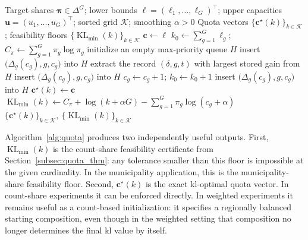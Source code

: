 \documentclass[10pt,journal]{IEEEtran}
\newcommand{\kGrid}{\mathcal{K}}
\newcommand{\1}{\mathbf{1}}
\newcommand{\bc}{\mathbf{c}}
\newcommand{\bpi}{\boldsymbol{\pi}}
\DeclareMathOperator{\KL}{KL}
\theoremstyle{ieeethm}
\begin{document}
\begingroup
\algrenewcommand{}
\algrenewcommand{}
\algnewcommand{}
\algnewcommand{}
\algnewcommand\Break{\State \algorithmicbreak}
\algnewcommand\Continue{\State \algorithmiccontinue}

\begin{algorithm}[t]
\caption{Greedy Computation of -Optimal Count Quotas Using a Priority Queue with Lazy Updates}
\label{alg:quota}
\begin{algorithmic}[1]
\Require
Target shares $\bpi\in\Delta^G$; lower bounds $\boldsymbol{\ell}=(\ell_1,\dots,\ell_G)^\top$; upper capacities $\mathbf u=(u_1,\dots,u_G)^\top$; sorted grid $\kGrid$; smoothing $\alpha>0$
\Ensure
Quota vectors $\{\bc^\star(k)\}_{k\in\kGrid}$; feasibility floors $\{\KL_{\min}(k)\}_{k\in\kGrid}$
\State $\bc\gets \boldsymbol{\ell}$ 
\State $k_0\gets \sum_{g=1}^{G}\ell_g$; $C_\pi\gets \sum_{g=1}^{G}\pi_g\log\pi_g$
\State initialize an empty max-priority queue $H$
        \State insert $\big(\Delta_g(c_g),g,c_g\big)$ into $H$ 
    \EndIf
\EndFor
\For{$k\in\kGrid$}
        \State extract the record $(\delta,g,t)$ with largest stored gain from $H$
            \State insert $\big(\Delta_g(c_g),g,c_g\big)$ into $H$
            \Continue
        \EndIf
            \Continue
        \EndIf
        \State $c_g\gets c_g+1$; $k_0\gets k_0+1$ 
            \State insert $\big(\Delta_g(c_g),g,c_g\big)$ into $H$ 
        \EndIf
    \EndWhile
    \State $\bc^\star(k)\gets \bc$ 
    \State $\KL_{\min}(k)\gets C_\pi+\log(k+\alpha G)-\sum_{g=1}^{G}\pi_g\log(c_g+\alpha)$
\EndFor
\State \Return $\{\bc^\star(k)\}_{k\in\kGrid},\ \{\KL_{\min}(k)\}_{k\in\kGrid}$
\end{algorithmic}
\end{algorithm}

Algorithm~\ref{alg:quota} produces two independently useful outputs. First, $\KL_{\min}(k)$ is the count-share feasibility certificate from Section~\ref{subsec:quota_thm}: any tolerance smaller than this floor is impossible at the given cardinality. In the municipality application, this is the municipality-share feasibility floor. Second, $\bc^\star(k)$ is the exact \gls{kl}-optimal quota vector. In count-share experiments it can be enforced directly. In weighted experiments it remains useful as a count-based initialization: it specifies a regionally balanced starting composition, even though in the weighted setting that composition no longer determines the final \gls{kl} value by itself.
\end{document}
